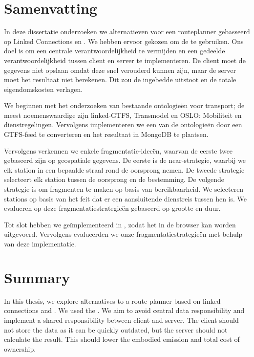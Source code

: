 \chapter*{Samenvatting}
In deze dissertatie onderzoeken we alternatieven voor een routeplanner gebasseerd op Linked Connections\cite{noauthor_linked_nodate} en . We hebben ervoor gekozen om de  te gebruiken. Ons doel is om een centrale verantwoordelijkheid\cite{rojas_melendez_julian_andres_decentralized_2020} te vermijden en een gedeelde verantwoordelijkheid tussen client en server te implementeren. De client moet de gegevens niet opslaan omdat deze snel verouderd kunnen zijn, maar de server moet het resultaat niet berekenen. Dit zou de ingebedde uitstoot en de totale eigendomskosten verlagen.

We beginnen met het onderzoeken van bestaande ontologieën voor transport; de meest noemenswaardige zijn linked-GTFS\cite{noauthor_opentransportlinked-gtfs_2023}, Transmodel\cite{noauthor_transmodel_nodate-1} en OSLO: Mobiliteit en dienstregelingen\cite{noauthor_oslo_nodate}. Vervolgens implementeren we een van de ontologieën door een GTFS-feed te converteren en het resultaat in MongoDB\cite{noauthor_mongodb_nodate} te plaatsen.

Vervolgens verkennen we enkele fragmentatie-ideeën, waarvan de eerste twee gebaseerd zijn op geospatiale gegevens. De eerste is de near-strategie, waarbij we elk station in een bepaalde straal rond de oorsprong nemen. De tweede strategie selecteert elk station tussen de oorsprong en de bestemming. De volgende strategie is om fragmenten te maken op basis van bereikbaarheid. 
We selecteren stations op basis van het feit dat er een aansluitende dienstreis tussen hen is. We evalueren op deze fragmentatiestrategieën gebaseerd op grootte en duur.

Tot slot hebben we  geïmplementeerd in , zodat het in de browser kan worden uitgevoerd. Vervolgens evalueerden we onze fragmentatiestrategieën met behulp van deze implementatie.

\newpage
\chapter*{Summary}
In this thesis, we explore alternatives to a route planner based on linked connections\cite{noauthor_linked_nodate-1} and . We used the \cite{delling_round-based_2015}. We aim to avoid central data responsibility\cite{rojas_melendez_julian_andres_decentralized_2020} and implement a shared responsibility between client and server. The client should not store the data as it can be quickly outdated, but the server should not calculate the result. This should lower the embodied emission and total cost of ownership. 

